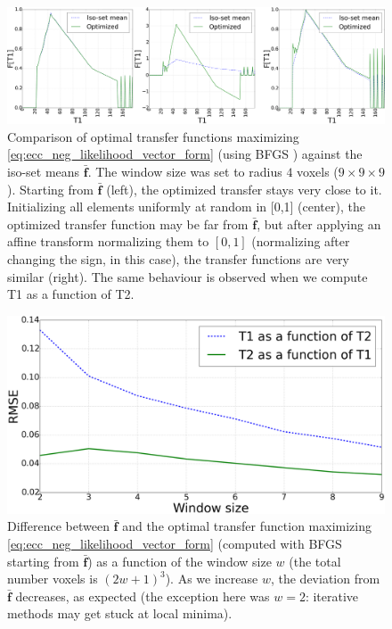 \begin{figure}[t]
\centering
    \includegraphics[width=1.0\linewidth]{images/comparison_optimal_transfers_t1lab_3.png}
    \caption{{\small Comparison of optimal transfer functions maximizing \eqref{eq:ecc_neg_likelihood_vector_form} (using BFGS \cite{GVK502988711}) against the iso-set means $\mathbf{\bar{f}}$. The window size was set to radius $4$ voxels ($9\times 9\times 9$). Starting from $\mathbf{\bar{f}}$ (left), the optimized transfer stays very close to it. Initializing all elements uniformly at random in [0,1] (center), the optimized transfer function may be far from $\mathbf{\bar{f}}$, but after applying an affine transform normalizing them to $[0,1]$ (normalizing after changing the sign, in this case), the transfer functions are very similar (right). The same behaviour is observed when we compute T1 as a function of T2.}}
\label{fig:comparison_optimal_transfers}\figcloser
\end{figure}
\begin{figure}[t]
\centering
    \includegraphics[width=1.0\linewidth]{images/LLR_transfer_rmse.png}
    \caption{{\small Difference between $\mathbf{\bar{f}}$ and the optimal transfer function maximizing \eqref{eq:ecc_neg_likelihood_vector_form} (computed with BFGS starting from $\mathbf{\bar{f}}$) as a function of the window size $w$ (the total number voxels is $(2w+1)^{3}$). As we increase $w$, the deviation from $\mathbf{\bar{f}}$ decreases, as expected (the exception here was $w=2$: iterative methods may get stuck at local minima).}}
\label{fig:LLR_transfer_rmse}\figcloser
\end{figure}
